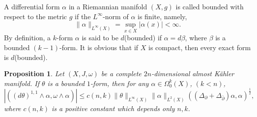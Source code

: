 \documentclass[12pt, twoside]{article}
\newtheorem{proposition}[theorem]{Proposition}
\theoremstyle{definition}
\numberwithin{equation}{section}
\def \a {\alpha }
\def \b {\beta}
\def \De {\Delta}
\def\w {\omega}
\def\Om{\Omega}
\def\pa{\partial}
\begin{document}
	A differential form $\a$ in a Riemannian manifold $(X,g)$ is called bounded with respect to the metric $g$ if the $L^{\infty}$-norm of $\a$ is finite, namely,
	$$\|\a\|_{L^{\infty}(X)}=\sup_{x\in X}|\a(x)|<\infty.$$
	By definition, a $k$-form $\a$ is said to be $d$(bounded) if $\a=d\b$, where $\b$ is a bounded $(k-1)$-form. It is obvious that if $X$ is compact, then every exact form is $d$(bounded).  
	\begin{proposition} 
		Let $(X,J,\w)$ be a complete $2n$-dimensional almost K\"{a}hler manifold. If $\theta$ is a bounded $1$-form, then for any $\a\in\Om^{k}_{0}(X)$, $(k<n)$,
		\begin{equation}\label{E23}
		|((d\theta)^{1,1}\wedge\a,\w\wedge\a)|\leq c(n,k)\|\theta\|_{L^{\infty}(X)}\|\a\|_{L^{2}(X)}((\De_{\pa}+\De_{\bar{\pa}})\a,\a)^{\frac{1}{2}},
		\end{equation} 
		where $c(n,k)$ is a positive constant which depends only $n,k$.
	\end{proposition}
\end{document}

